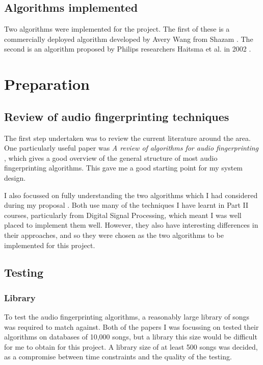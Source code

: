 \documentclass[12pt,a4paper,twoside,openright]{report}
\begin{document}
\section{Algorithms implemented}

Two algorithms were implemented for the project. The first of these is a commercially deployed algorithm developed by Avery Wang from Shazam \cite{Wang03}. The second is an algorithm proposed by Philips researchers Haitsma et al. in 2002 \cite{Haitsma02}.



\chapter{Preparation}

\section{Review of audio fingerprinting techniques}

The first step undertaken was to review the current literature around the area. One particularly useful paper was \textit{A review of algorithms for audio fingerprinting} \cite{Cano02}, which gives a good overview of the general structure of most audio fingerprinting algorithms. This gave me a good starting point for my system design.

I also focussed on fully understanding the two algorithms which I had considered during my proposal \cite{Haitsma02} \cite{Wang03}. Both use many of the techniques I have learnt in Part II courses, particularly from Digital Signal Processing, which meant I was well placed to implement them well. However, they also have interesting differences in their approaches, and so they were chosen as the two algorithms to be implemented for this project.


\section{Testing}

\subsection{Library}

To test the audio fingerprinting algorithms, a reasonably large library of songs was required to match against. Both of the papers I was focussing on tested their algorithms on databases of 10,000 songs, but a library this size would be difficult for me to obtain for this project. A library size of at least 500 songs was decided, as a compromise between time constraints and the quality of the testing.
\end{document}
